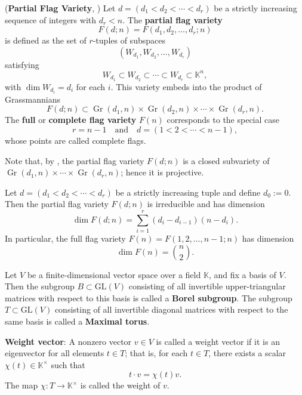 \documentclass{amsart}
\DeclareMathOperator{\Gr}{Gr}
\begin{document}
\begin{definition}\label{def:partial-flag-variety}
(\textbf{Partial Flag Variety}, {\cite[Definition 9.5.1]{lakshmibai2009flag}})
Let \( d = (d_1 < d_2 < \cdots < d_r) \) be a strictly increasing sequence of integers with \( d_r < n \). The \textbf{partial flag variety}
\[
F(d; n) = F(d_1, d_2, \ldots, d_r; n)
\]
is defined as the set of \( r \)-tuples of subspaces
\[
(W_{d_1}, W_{d_2}, \ldots, W_{d_r})
\]
satisfying
\[
W_{d_1} \subset W_{d_2} \subset \cdots \subset W_{d_r} \subset \mathbb{K}^n,
\]
with \(\dim W_{d_i} = d_i\) for each \( i \). This variety embeds into the product of Grassmannians
\[
F(d; n) \subset \Gr(d_1, n) \times \Gr(d_2, n) \times \cdots \times \Gr(d_r, n).
\]
The \textbf{full} or \textbf{complete flag variety} \( F(n) \) corresponds to the special case
\[
r = n - 1 \quad \text{and} \quad d = (1 < 2 < \cdots < n - 1),
\]
whose points are called complete flags.
\end{definition}
Note that, by \cite[Example 9.5.2]{lakshmibai2009flag}, the partial flag variety 
$F(d;n)$ is a closed subvariety of 
$\Gr(d_1,n) \times \cdots \times \Gr(d_r,n)$; hence it is projective.

\begin{proposition}\cite[Proposition 2.1]{friedman2025grassmannflagvarietieslinear}
Let \( d = (d_1 < d_2 < \cdots < d_r) \) be a strictly increasing tuple and define \( d_0 := 0 \). Then the partial flag variety \( F(d; n) \) is irreducible and has dimension
\[
\dim F(d; n) = \sum_{i=1}^r (d_i - d_{i-1})(n - d_i).
\]
In particular, the full flag variety \( F(n) = F(1, 2, \ldots, n-1; n) \) has dimension
\[
\dim F(n) = \binom{n}{2}.
\]
\end{proposition}

\begin{definition}
Let \( V \) be a finite-dimensional vector space over a field \( \mathbb{K} \), and fix a basis of \( V \). Then the subgroup \( B \subset \mathrm{GL}(V) \) consisting of all invertible upper-triangular matrices with respect to this basis is called a \textbf{Borel subgroup}.
The subgroup \( T \subset \mathrm{GL}(V) \) consisting of all invertible diagonal matrices with respect to the same basis is called a \textbf{Maximal torus}.
\end{definition}

\begin{definition}
\textbf{Weight vector}:
A nonzero vector \( v \in V \) is called a weight vector if it is an eigenvector for all elements \( t \in T \); that is, for each \( t \in T \), there exists a scalar \( \chi(t) \in \mathbb{K}^\times \) such that
\[
t \cdot v = \chi(t) v.
\]
The map \( \chi : T \to \mathbb{K}^\times \) is called the weight of \( v \).
\end{definition}
\end{document}
